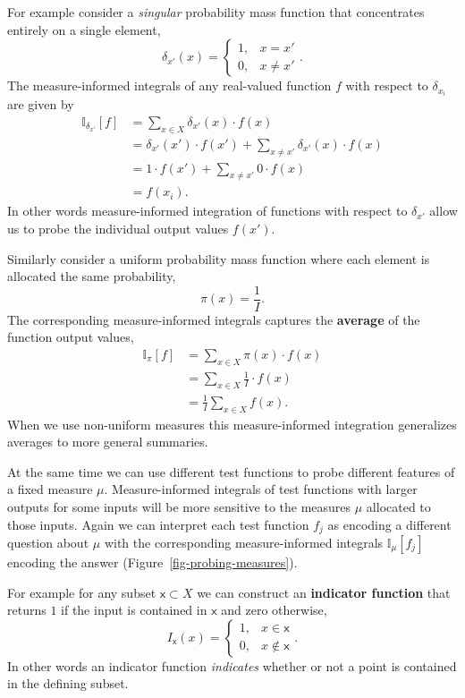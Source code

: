 \documentclass[
  letterpaper,
  DIV=11,
  numbers=noendperiod]{scrartcl}
\begin{document}
For example consider a \emph{singular} probability mass function that
concentrates entirely on a single element, \[
\delta_{x'} (x) =
\left\{
\begin{array}{rr}
1, & x = x' \\
0, & x \neq x'
\end{array}
\right. .
\] The measure-informed integrals of any real-valued function \(f\) with
respect to \(\delta_{x_{i}}\) are given by \begin{align*}
\mathbb{I}_{\delta_{x'}}[f]
&= \sum_{x \in X} \delta_{x'}(x) \cdot f(x)
\\
&= \delta_{x'}(x') \cdot f(x')
  + \sum_{x \neq x'} \delta_{x'}(x) \cdot f(x)
\\
&=  1 \cdot f(x')
  + \sum_{x \neq x'} 0 \cdot f(x)
\\
&= f(x_{i}).
\end{align*} In other words measure-informed integration of functions
with respect to \(\delta_{x'}\) allow us to probe the individual output
values \(f(x')\).

Similarly consider a uniform probability mass function where each
element is allocated the same probability, \[
\pi(x) = \frac{1}{I}.
\] The corresponding measure-informed integrals captures the
\textbf{average} of the function output values, \begin{align*}
\mathbb{I}_{\pi}[f]
&= \sum_{x \in X} \pi(x) \cdot f(x)
\\
&= \sum_{x \in X} \frac{1}{I} \cdot f(x)
\\
&= \frac{1}{I} \sum_{x \in X} f(x).
\end{align*} When we use non-uniform measures this measure-informed
integration generalizes averages to more general summaries.

At the same time we can use different test functions to probe different
features of a fixed measure \(\mu\). Measure-informed integrals of test
functions with larger outputs for some inputs will be more sensitive to
the measures \(\mu\) allocated to those inputs. Again we can interpret
each test function \(f_{j}\) as encoding a different question about
\(\mu\) with the corresponding measure-informed integrals
\(\mathbb{I}_{\mu}[f_{j}]\) encoding the answer
(Figure~\ref{fig-probing-measures}).

For example for any subset \(\mathsf{x} \subset X\) we can construct an
\textbf{indicator function} that returns \(1\) if the input is contained
in \(\mathsf{x}\) and zero otherwise, \[
I_{\mathsf{x}} (x) =
\left\{
\begin{array}{rr}
1, & x \in \mathsf{x} \\
0, & x \notin \mathsf{x}
\end{array}
\right. .
\] In other words an indicator function \emph{indicates} whether or not
a point is contained in the defining subset.
\end{document}
